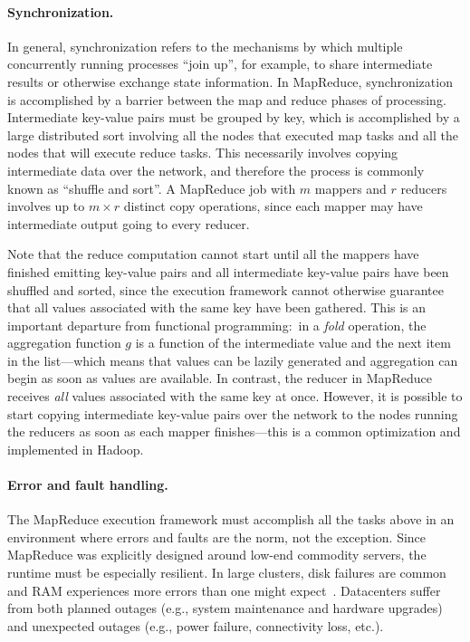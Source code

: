 \documentclass[11pt]{article}
\begin{document}
\paragraph{Synchronization.} In general, synchronization refers to
the mechanisms by which multiple concurrently running processes ``join
up'', for example, to share intermediate results or otherwise exchange
state information.  In MapReduce, synchronization is accomplished by a
barrier between the map and reduce phases of processing.  Intermediate
key-value pairs must be grouped by key, which is accomplished by a
large distributed sort involving all the nodes that executed map tasks
and all the nodes that will execute reduce tasks.  This necessarily
involves copying intermediate data over the network, and therefore the
process is commonly known as ``shuffle and sort''.  A MapReduce job
with $m$ mappers and $r$ reducers involves up to $m \times r$ distinct
copy operations, since each mapper may have intermediate output going
to every reducer.

Note that the reduce computation cannot start until all the mappers
have finished emitting key-value pairs and all intermediate key-value
pairs have been shuffled and sorted, since the execution framework
cannot otherwise guarantee that all values associated with the same
key have been gathered.  This is an important departure from
functional programming:\ in a \emph{fold} operation, the aggregation
function $g$ is a function of the intermediate value and the next item
in the list---which means that values can be lazily generated and
aggregation can begin as soon as values are available.  In contrast,
the reducer in MapReduce receives \emph{all} values associated with the
same key at once.  However, it is possible to start copying
intermediate key-value pairs over the network to the nodes running the
reducers as soon as each mapper finishes---this is a common
optimization and implemented in Hadoop.

\paragraph{Error and fault handling.}  The MapReduce execution
framework must accomplish all the tasks above in an environment where
errors and faults are the norm, not the exception.  Since MapReduce
was explicitly designed around low-end commodity servers, the runtime
must be especially resilient.  In large clusters, disk failures are
common~\cite{Pinheiro_etal_2007} and RAM experiences more errors than
one might expect~\cite{Schroeder_etal_2009}.  Datacenters suffer from
both planned outages (e.g., system maintenance and hardware upgrades)
and unexpected outages (e.g., power failure, connectivity loss, etc.).
\end{document}
